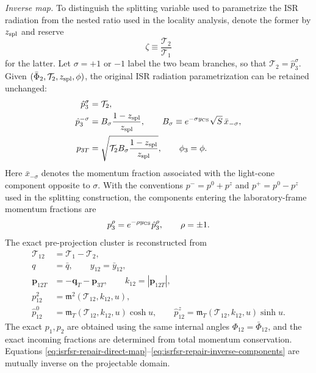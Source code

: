 \documentclass[11pt]{article}
\newcommand{\Ph}{\Phi}
\begin{document}
\medskip
\noindent
\textit{Inverse map.}
To distinguish the splitting variable used to parametrize the ISR radiation from the nested ratio used in
the locality analysis, denote the former by $z_{\rm spl}$ and reserve
\begin{equation}
\zeta\equiv\frac{\mathcal T_2}{\mathcal T_1}
\label{eq:isrfsr-repair-zeta-definition}
\end{equation}
for the latter.  Let $\sigma=+1$ or $-1$ label the two beam branches, so that
$\mathcal T_2=\hat p_3^\sigma$.  Given $(\bar\Ph_2,\mathcal T_2,z_{\rm spl},\phi)$, the original ISR
radiation parametrization can be retained unchanged:
\begin{align}
\hat p_3^\sigma
&=\mathcal T_2,
\nonumber\\
\hat p_3^{-\sigma}
&=
B_\sigma\frac{1-z_{\rm spl}}{z_{\rm spl}},
\qquad
B_\sigma
\equiv
e^{-\sigma y_{\rm CS}}\sqrt S\,\bar x_{-\sigma},
\nonumber\\
p_{3T}
&=
\sqrt{
\mathcal T_2 B_\sigma
\frac{1-z_{\rm spl}}{z_{\rm spl}}
},
\qquad
\phi_3=\phi.
\label{eq:isrfsr-repair-radiation-map}
\end{align}
Here $\bar x_{-\sigma}$ denotes the momentum fraction associated with the light-cone component opposite to
$\sigma$.  With the conventions $p^-=p^0+p^z$ and $p^+=p^0-p^z$ used in the splitting construction, the
components entering the laboratory-frame momentum fractions are
\begin{equation}
p_3^\rho=e^{-\rho y_{\rm CS}}\hat p_3^\rho,
\qquad
\rho=\pm1.
\label{eq:isrfsr-repair-radiation-boost}
\end{equation}
The exact pre-projection cluster is reconstructed from
\begin{align}
\mathcal T_{12}
&=\mathcal T_1-\mathcal T_2,
\label{eq:isrfsr-repair-inverse-T12}
\\
q&=\bar q,
\qquad
y_{12}=\bar y_{12},
\label{eq:isrfsr-repair-inverse-preserved}
\\
\boldsymbol p_{12T}
&=-\boldsymbol q_T-\boldsymbol p_{3T},
\qquad
k_{12}=|\boldsymbol p_{12T}|,
\label{eq:isrfsr-repair-inverse-pt}
\\
p_{12}^2
&=
\mathfrak m^2(\mathcal T_{12},k_{12},u),
\label{eq:isrfsr-repair-inverse-mass}
\\
\hat p_{12}^0
&=
\mathfrak m_T(\mathcal T_{12},k_{12},u)\cosh u,
\qquad
\hat p_{12}^z
=
\mathfrak m_T(\mathcal T_{12},k_{12},u)\sinh u.
\label{eq:isrfsr-repair-inverse-components}
\end{align}
The exact $p_1,p_2$ are obtained using the same internal angles $\Phi_{12}=\bar\Phi_{12}$, and the exact
incoming fractions are determined from total momentum conservation.  Equations
\eqref{eq:isrfsr-repair-direct-map}--\eqref{eq:isrfsr-repair-inverse-components} are mutually inverse on
the projectable domain.
\end{document}

